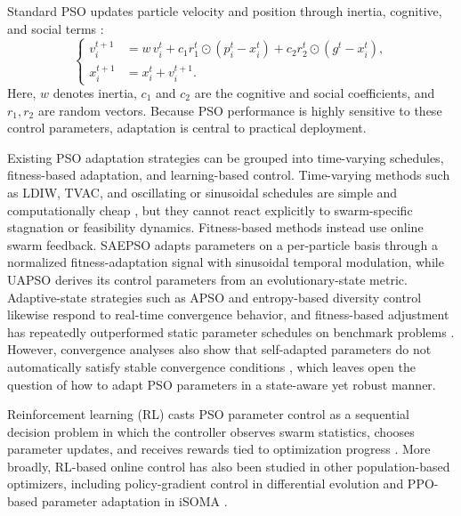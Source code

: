 \documentclass[final,5p,times]{elsarticle}
\begin{document}
Standard PSO updates particle velocity and position through inertia, cognitive, and social terms \cite{Kennedy1995Particle, Clerc2002The}:
\begin{equation}
\left\{
\begin{aligned}
v_i^{t+1} &= w\,v_i^{t} + c_1 r_1^{t}\odot(p_i^{t}-x_i^{t}) + c_2 r_2^{t}\odot(g^{t}-x_i^{t}),\\
x_i^{t+1} &= x_i^{t}+v_i^{t+1}.
\end{aligned}
\right.
\end{equation}
Here, \(w\) denotes inertia, \(c_1\) and \(c_2\) are the cognitive and social coefficients, and \(r_1,r_2\) are random vectors. Because PSO performance is highly sensitive to these control parameters, adaptation is central to practical deployment.

Existing PSO adaptation strategies can be grouped into time-varying schedules, fitness-based adaptation, and learning-based control.
Time-varying methods such as LDIW, TVAC, and oscillating or sinusoidal schedules are simple and computationally cheap \cite{Eberhart2000Comparing, Ratnaweera2004Selforganizing, Nickabadi2011A, Kentzoglanakis2009Particle, Chen2018A}, but they cannot react explicitly to swarm-specific stagnation or feasibility dynamics.
Fitness-based methods instead use online swarm feedback.
SAEPSO \cite{Liu2025A} adapts parameters on a per-particle basis through a normalized fitness-adaptation signal with sinusoidal temporal modulation, while UAPSO \cite{Isiet2019Selfadapting} derives its control parameters from an evolutionary-state metric.
Adaptive-state strategies such as APSO \cite{Zhan2009Adaptive} and entropy-based diversity control \cite{Han2022Improved} likewise respond to real-time convergence behavior, and fitness-based adjustment has repeatedly outperformed static parameter schedules on benchmark problems \cite{Li2017Particle}.
However, convergence analyses also show that self-adapted parameters do not automatically satisfy stable convergence conditions \cite{Harrison2018Selfadaptive}, which leaves open the question of how to adapt PSO parameters in a state-aware yet robust manner.

Reinforcement learning (RL) casts PSO parameter control as a sequential decision problem in which the controller observes swarm statistics, chooses parameter updates, and receives rewards tied to optimization progress \cite{Sutton2018Reinforcement, Bai2023Evolutionary}.
More broadly, RL-based online control has also been studied in other population-based optimizers, including policy-gradient control in differential evolution and PPO-based parameter adaptation in iSOMA \cite{Sun2021Learning, Klein2024Optimizing}.
\end{document}
